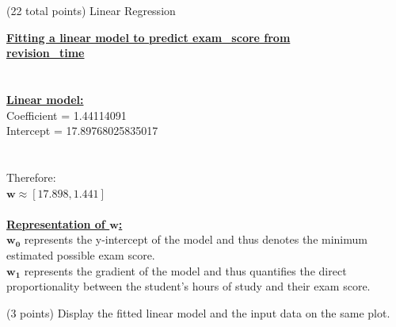 \documentclass[12pt]{article}
\begin{document}
\begin{question}{(22 total points) Linear Regression}
\begin{subquestion}
\begin{answerbox}{25em}
\large{\textbf{\underline{Fitting a linear model to predict exam\_score from}}}\\
\large{\textbf{\underline{revision\_time}}}\\
\\
\\
\normalsize{
\textbf{\underline{Linear model:}}\\
Coefficient = 1.44114091\\
Intercept = 17.89768025835017\\
\\
\\
Therefore:\\
$\boldsymbol{w} \approx [17.898, 1.441]$\\
\\
\textbf{\underline{Representation of $\boldsymbol{w}$:}}\\
$\boldsymbol{w_0}$ represents the y-intercept of the model and thus denotes the minimum estimated possible exam score.\\
$\boldsymbol{w_1}$ represents the gradient of the model and thus quantifies the direct proportionality between the student's hours of study and their exam score. 
}
\end{answerbox}



\end{subquestion}



%
%
\begin{subquestion}{(3 points) Display the fitted linear model and the input data on the same plot.
}



\end{subquestion}
\end{question}
\end{document}
